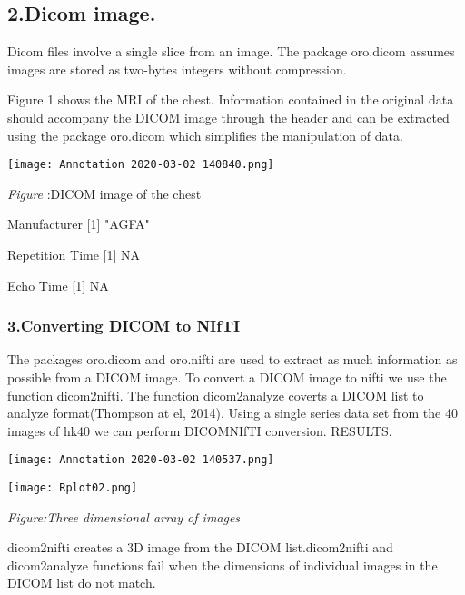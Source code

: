 \documentclass[10pt]{article}\usepackage[]{graphicx}\usepackage[]{color}
\begin{document}
{\begin{center}
\end{center}

\subsection*{2.Dicom image.}

Dicom files involve a single slice from an image. The package oro.dicom assumes
images are stored as two-bytes integers without compression.

Figure 1 shows the MRI of the chest. Information contained in the original data
should accompany the DICOM image through the header and can be extracted using
the package oro.dicom which simplifies the manipulation of data.
\begin{center}
\texttt{[image: Annotation 2020-03-02 140840.png]}
\end{center}
\textit{Figure} :DICOM image of the chest

Manufacturer
[1] "AGFA"


Repetition Time
[1] NA


Echo Time
[1] NA
\subsubsection*{3.Converting DICOM to NIfTI}
The packages oro.dicom and oro.nifti are used to extract as much information as
possible from a DICOM image. To convert a DICOM image to nifti we use the
function dicom2nifti. The function dicom2analyze coverts a DICOM list to analyze
format(Thompson at el, 2014).
Using a single series data set from the 40 images of hk40 we can perform DICOMNIfTI
conversion.
RESULTS.

\begin{center}
\texttt{[image: Annotation 2020-03-02 140537.png]}


\end{center}


\begin{center}
\texttt{[image: Rplot02.png]}


\end{center}
\textit{Figure:Three dimensional array of images }

dicom2nifti creates a 3D image from the DICOM list.dicom2nifti and dicom2analyze functions fail when the dimensions of individual images in the DICOM list do not match.
\begin{center}

\end{center}}
\end{document}
